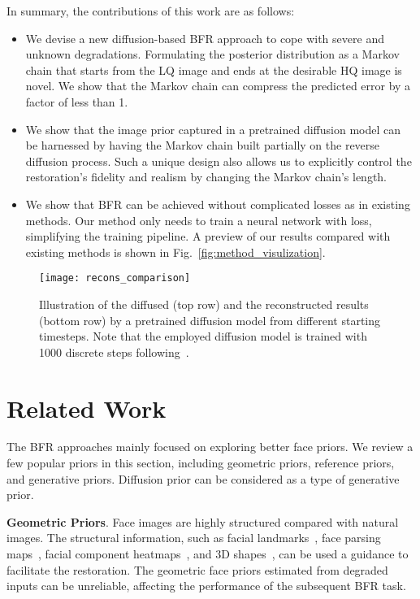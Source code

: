 \documentclass[10pt,twocolumn,letterpaper]{article}
\begin{document}
In summary, the contributions of this work are as follows:
\begin{itemize}[topsep=0pt,parsep=0pt,leftmargin=18pt]
    \item We devise a new diffusion-based BFR approach to cope with severe and unknown degradations. Formulating the posterior distribution as a Markov chain that starts from the LQ image and ends at the desirable HQ image is novel. We show that the Markov chain can compress the predicted error by a factor of less than 1.
    \item We show that the image prior captured in a pretrained diffusion model can be harnessed by having the Markov chain built partially on the reverse diffusion process. Such a unique design also allows us to explicitly control the restoration's fidelity and realism by changing the Markov chain's length.
    \item We show that BFR can be achieved without complicated losses as in existing methods. Our method only needs to train a neural network with  loss, simplifying the training pipeline. A preview of our results compared with existing methods is shown in Fig.~\ref{fig:method_visulization}.
\end{itemize}

\begin{figure*}[t]
    \centering
    \texttt{[image: recons\_comparison]}
    \caption{Illustration of the diffused  (top row) and the reconstructed results
        (bottom row) by a pretrained diffusion model from different
        starting timesteps. Note that the employed diffusion model is trained
        with 1000 discrete steps following~\cite{dhariwal2021diffusion}.}
    \label{fig:recons_comprison}
\end{figure*}
\section{Related Work}
The BFR approaches mainly focused on exploring better face priors. We review a few popular priors in this section, including geometric priors, reference priors, and generative priors. Diffusion prior can be considered as a type of generative prior.

\noindent\textbf{Geometric Priors}. Face images are highly structured compared with natural images. The structural information, such as facial landmarks~\cite{chen2018fsrnet}, face parsing maps~\cite{chen2021progressive,shen2018deep,chen2021progressive}, facial component heatmaps~\cite{li2020blind}, and 3D shapes~\cite{ren2019face,hu2020face,zhu2022blind}, can be used a guidance to facilitate the restoration. The geometric face priors estimated from degraded inputs can be unreliable, affecting the performance of the subsequent BFR task.
\end{document}

